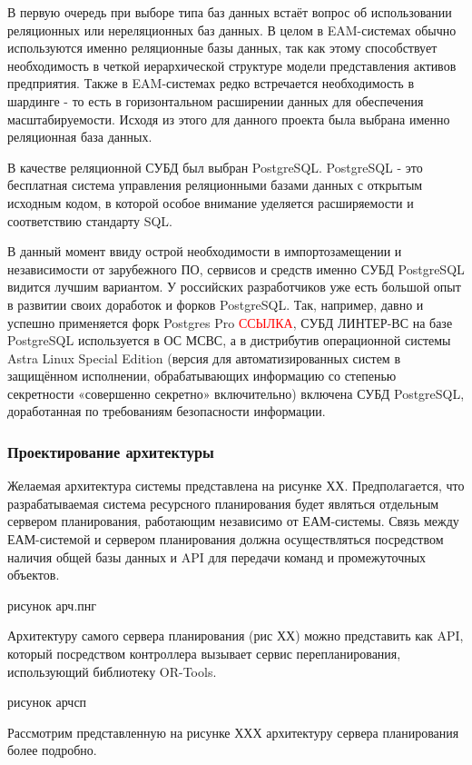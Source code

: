 В первую очередь при выборе типа баз данных встаёт вопрос об использовании реляционных или нереляционных баз данных. В целом в EAM-системах обычно используются именно реляционные базы данных, так как этому способствует необходимость в четкой иерархической структуре модели представления активов предприятия. Также в EAM-системах редко встречается необходимость в шардинге - то есть в горизонтальном расширении данных для обеспечения масштабируемости. Исходя из этого для данного проекта была выбрана именно реляционная база данных.

В качестве реляционной СУБД был выбран PostgreSQL. PostgreSQL - это бесплатная система управления реляционными базами данных с открытым исходным кодом, в которой особое внимание уделяется расширяемости и соответствию стандарту SQL.

В данный момент ввиду острой необходимости в импортозамещении и независимости от зарубежного ПО, сервисов и средств именно СУБД PostgreSQL видится лучшим вариантом. У российских разработчиков уже есть большой опыт в развитии своих доработок и форков PostgreSQL. Так, например, давно и успешно применяется форк Postgres Pro \textcolor{red}{ССЫЛКА}, СУБД ЛИНТЕР-ВС на базе PostgreSQL используется в ОС МСВС, а в дистрибутив операционной системы Astra Linux Special Edition (версия для автоматизированных систем в защищённом исполнении, обрабатывающих информацию со степенью секретности «совершенно секретно» включительно) включена СУБД PostgreSQL, доработанная по требованиям безопасности информации.

\subsubsection{Проектирование архитектуры}

Желаемая архитектура системы представлена на рисунке ХХ. Предполагается, что разрабатываемая система ресурсного планирования будет являться отдельным сервером планирования, работающим независимо от ЕАМ-системы. Связь между ЕАМ-системой и сервером планирования должна осуществляться посредством наличия общей базы данных и API для передачи команд и промежуточных объектов.

рисунок арч.пнг

Архитектуру самого сервера планирования (рис ХХ) можно представить как API, который посредством контроллера вызывает сервис перепланирования, использующий библиотеку OR-Tools.

рисунок арчсп

Рассмотрим представленную на рисунке ХХХ архитектуру сервера планирования более подробно.

